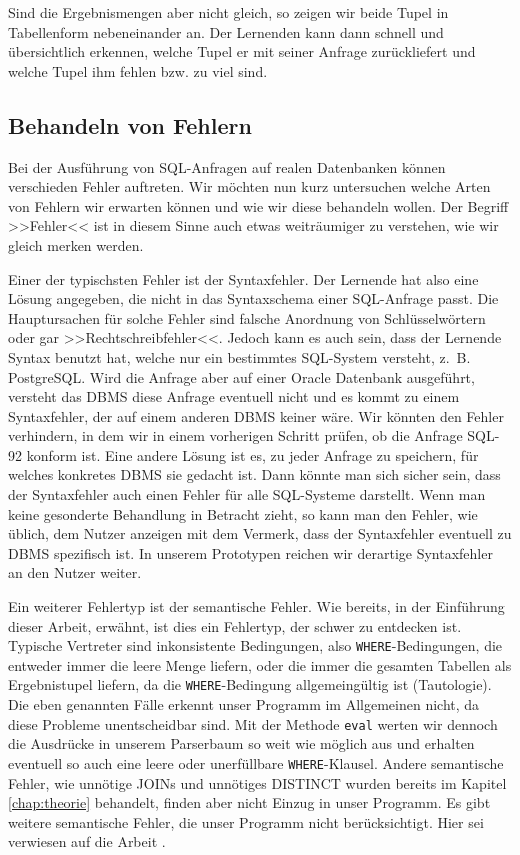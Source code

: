 Sind die Ergebnismengen aber nicht gleich, so zeigen wir beide Tupel in Tabellenform nebeneinander an. Der Lernenden kann dann schnell und übersichtlich erkennen, welche Tupel er mit seiner Anfrage zurückliefert und welche Tupel ihm fehlen bzw. zu viel sind.

\subsection{Behandeln von Fehlern}

Bei der Ausführung von SQL-Anfragen auf realen Datenbanken können verschieden Fehler auftreten. Wir möchten nun kurz untersuchen welche Arten von Fehlern wir erwarten können und wie wir diese behandeln wollen. Der Begriff >>Fehler<< ist in diesem Sinne auch etwas weiträumiger zu verstehen, wie wir gleich merken werden.

Einer der typischsten Fehler ist der Syntaxfehler. Der Lernende hat also eine Lösung angegeben, die nicht in das Syntaxschema einer SQL-Anfrage passt. Die Hauptursachen für solche Fehler sind falsche Anordnung von Schlüsselwörtern oder gar >>Rechtschreibfehler<<. Jedoch kann es auch sein, dass der Lernende Syntax benutzt hat, welche nur ein bestimmtes SQL-System versteht, \mbox{z. B.} PostgreSQL. Wird die Anfrage aber auf einer Oracle Datenbank ausgeführt, versteht das DBMS diese Anfrage eventuell nicht und es kommt zu einem Syntaxfehler, der auf einem anderen DBMS keiner wäre. Wir könnten den Fehler verhindern, in dem wir in einem vorherigen Schritt prüfen, ob die Anfrage SQL-92 konform ist. Eine andere Lösung ist es, zu jeder Anfrage zu speichern, für welches konkretes DBMS sie gedacht ist. Dann könnte man sich sicher sein, dass der Syntaxfehler auch einen Fehler für alle SQL-Systeme darstellt. Wenn man keine gesonderte Behandlung in Betracht zieht, so kann man den Fehler, wie üblich, dem Nutzer anzeigen mit dem Vermerk, dass der Syntaxfehler eventuell zu DBMS spezifisch ist. In unserem Prototypen reichen wir derartige Syntaxfehler an den Nutzer weiter.

Ein weiterer Fehlertyp ist der semantische Fehler. Wie bereits, in der Einführung dieser Arbeit, erwähnt, ist dies ein Fehlertyp, der schwer zu entdecken ist. Typische Vertreter sind inkonsistente Bedingungen, also \verb|WHERE|-Bedingungen, die entweder immer die leere Menge liefern, oder die immer die gesamten Tabellen als Ergebnistupel liefern, da die \verb|WHERE|-Bedingung allgemeingültig ist (Tautologie). Die eben genannten Fälle erkennt unser Programm im Allgemeinen nicht, da diese Probleme unentscheidbar sind. Mit der Methode \verb|eval| werten wir dennoch die Ausdrücke in unserem Parserbaum so weit wie möglich aus und erhalten eventuell so auch eine leere oder unerfüllbare \verb|WHERE|-Klausel. Andere semantische Fehler, wie unnötige JOINs und unnötiges DISTINCT wurden bereits im Kapitel \ref{chap:theorie} behandelt, finden aber nicht Einzug in unser Programm. Es gibt weitere semantische Fehler, die unser Programm nicht berücksichtigt. Hier sei verwiesen auf die Arbeit \cite{brass2}. 

